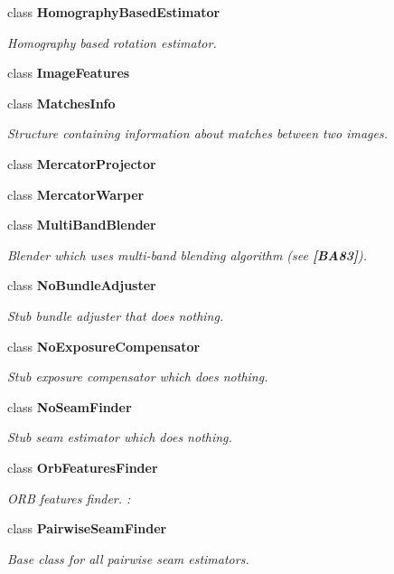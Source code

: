 \begin{DoxyCompactItemize}
class {\bfseries Homography\+Based\+Estimator}
\begin{DoxyCompactList}\small\item\em Homography based rotation estimator. \end{DoxyCompactList}\item 
class {\bfseries Image\+Features}
\item 
class {\bfseries Matches\+Info}
\begin{DoxyCompactList}\small\item\em Structure containing information about matches between two images. \end{DoxyCompactList}\item 
class {\bfseries Mercator\+Projector}
\item 
class {\bfseries Mercator\+Warper}
\item 
class {\bfseries Multi\+Band\+Blender}
\begin{DoxyCompactList}\small\item\em Blender which uses multi-\/band blending algorithm (see {\bfseries [B\+A83]}). \end{DoxyCompactList}\item 
class {\bfseries No\+Bundle\+Adjuster}
\begin{DoxyCompactList}\small\item\em Stub bundle adjuster that does nothing. \end{DoxyCompactList}\item 
class {\bfseries No\+Exposure\+Compensator}
\begin{DoxyCompactList}\small\item\em Stub exposure compensator which does nothing. \end{DoxyCompactList}\item 
class {\bfseries No\+Seam\+Finder}
\begin{DoxyCompactList}\small\item\em Stub seam estimator which does nothing. \end{DoxyCompactList}\item 
class {\bfseries Orb\+Features\+Finder}
\begin{DoxyCompactList}\small\item\em O\+RB features finder. \+: \end{DoxyCompactList}\item 
class {\bfseries Pairwise\+Seam\+Finder}
\begin{DoxyCompactList}\small\item\em Base class for all pairwise seam estimators. \end{DoxyCompactList}\item 

\end{DoxyCompactItemize}
